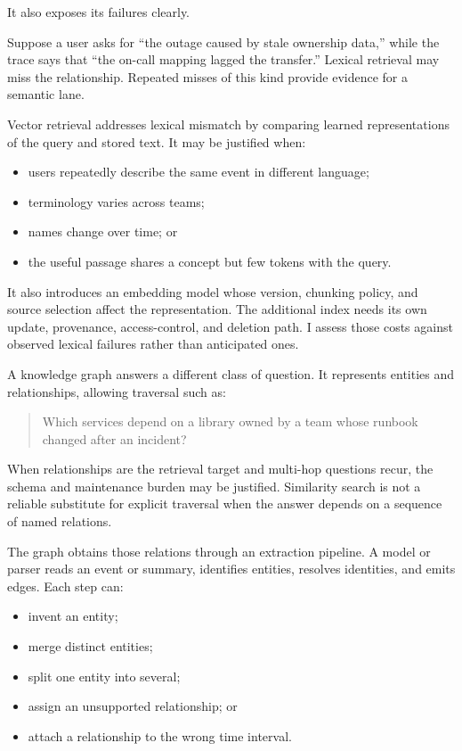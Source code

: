 It also exposes its failures clearly.

Suppose a user asks for ``the outage caused by stale ownership data,'' while the trace says that ``the on-call mapping lagged the transfer.'' Lexical retrieval may miss the relationship. Repeated misses of this kind provide evidence for a semantic lane.


Vector retrieval addresses lexical mismatch by comparing learned representations of the query and stored text. It may be justified when:

\begin{itemize}
\tightlist
\item
  users repeatedly describe the same event in different language;
\item
  terminology varies across teams;
\item
  names change over time; or
\item
  the useful passage shares a concept but few tokens with the query.
\end{itemize}

It also introduces an embedding model whose version, chunking policy, and source selection affect the representation. The additional index needs its own update, provenance, access-control, and deletion path. I assess those costs against observed lexical failures rather than anticipated ones.

A knowledge graph answers a different class of question. It represents entities and relationships, allowing traversal such as:

\begin{quote}
Which services depend on a library owned by a team whose runbook changed after an incident?
\end{quote}

When relationships are the retrieval target and multi-hop questions recur, the schema and maintenance burden may be justified. Similarity search is not a reliable substitute for explicit traversal when the answer depends on a sequence of named relations.


The graph obtains those relations through an extraction pipeline. A model or parser reads an event or summary, identifies entities, resolves identities, and emits edges. Each step can:

\begin{itemize}
\tightlist
\item
  invent an entity;
\item
  merge distinct entities;
\item
  split one entity into several;
\item
  assign an unsupported relationship; or
\item
  attach a relationship to the wrong time interval.
\end{itemize}

